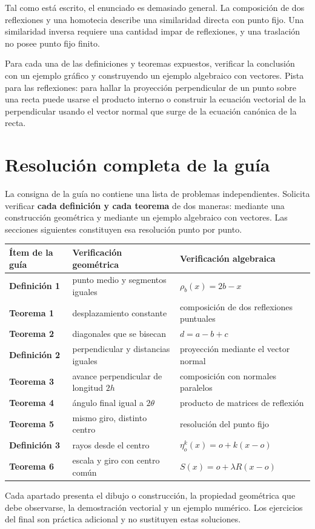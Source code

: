 \begin{atencion}
Tal como está escrito, el enunciado es demasiado general. La composición de dos reflexiones
y una homotecia describe una similaridad directa con punto fijo. Una similaridad inversa
requiere una cantidad impar de reflexiones, y una traslación no posee punto fijo finito.
\end{atencion}

\begin{enunciado}[Ejercicios]
Para cada una de las definiciones y teoremas expuestos, verificar la conclusión con un ejemplo
gráfico y construyendo un ejemplo algebraico con vectores. Pista para las reflexiones: para
hallar la proyección perpendicular de un punto sobre una recta puede usarse el producto
interno o construir la ecuación vectorial de la perpendicular usando el vector normal que
surge de la ecuación canónica de la recta.
\end{enunciado}

\section{Resolución completa de la guía}

La consigna de la guía no contiene una lista de problemas independientes. Solicita verificar
\textbf{cada definición y cada teorema} de dos maneras: mediante una construcción geométrica
y mediante un ejemplo algebraico con vectores. Las secciones siguientes constituyen esa
resolución punto por punto.

\begin{center}
\begin{tabularx}{\textwidth}{>{\bfseries}p{34mm} X X}
\toprule
Ítem de la guía & Verificación geométrica & Verificación algebraica\\
\midrule
Definición 1 & punto medio y segmentos iguales & \(\rho_b(x)=2b-x\)\\
Teorema 1 & desplazamiento constante & composición de dos reflexiones puntuales\\
Teorema 2 & diagonales que se bisecan & \(d=a-b+c\)\\
Definición 2 & perpendicular y distancias iguales & proyección mediante el vector normal\\
Teorema 3 & avance perpendicular de longitud \(2h\) & composición con normales paralelos\\
Teorema 4 & ángulo final igual a \(2\theta\) & producto de matrices de reflexión\\
Teorema 5 & mismo giro, distinto centro & resolución del punto fijo\\
Definición 3 & rayos desde el centro & \(\eta_o^k(x)=o+k(x-o)\)\\
Teorema 6 & escala y giro con centro común & \(S(x)=o+\lambda R(x-o)\)\\
\bottomrule
\end{tabularx}
\end{center}

\begin{idea}
Cada apartado presenta el dibujo o construcción, la propiedad geométrica que debe observarse,
la demostración vectorial y un ejemplo numérico. Los ejercicios del final son práctica
adicional y no sustituyen estas soluciones.
\end{idea}

